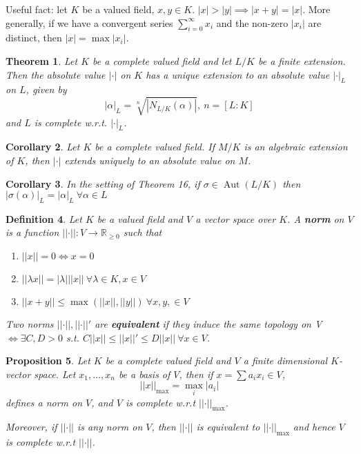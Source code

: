 \documentclass[a4paper]{article}
\newtheorem{definition}{Definition}
\newtheorem{theorem}[definition]{Theorem}
\newtheorem{prop}[definition]{Proposition}
\newtheorem{corollary}[definition]{Corollary}
\newcommand*\abs[1]{\left|#1\right|}
\newcommand*\norm[1]{\abs{\abs{#1}}}
\DeclareMathOperator{\Aut}{Aut}
\begin{document}
Useful fact: let $K$ be a valued field, $x, y \in K$. $\abs{x} > \abs{y} \implies \abs{x+y} = \abs{x}$.
More generally, if we have a convergent series $\sum_{i=0}^\infty x_i$ and the non-zero $\abs{x_i}$ are distinct,
then $\abs{x} = \max \abs{x_i}$.

\begin{theorem}
	Let $K$ be a complete valued field and let $L/K$ be a finite extension.
	Then the absolute value $\abs{\cdot}$ on $K$ has a unique extension to an absolute value $\abs{\cdot}_L$ on $L$,
	given by $$\abs{\alpha}_L = \sqrt[n]{\abs{N_{L/K}(\alpha)}},\ n=[L:K]$$
	and $L$ is complete w.r.t. $\abs{\cdot}_L$. 
	\label{29}
\end{theorem}

\begin{corollary}
	Let $K$ be a complete valued field. 
	If $M/K$ is an algebraic extension of $K$,
	then $\abs{\cdot}$ extends uniquely to an absolute value on $M$.
\end{corollary}

\begin{corollary}
	In the setting of Theorem 16, if $\sigma \in \Aut(L/K)$ then $\abs{\sigma(\alpha)}_L = \abs{\alpha}_L\ \forall \alpha \in L$
\end{corollary}

\begin{definition}
	Let $K$ be a valued field and $V$ a vector space over $K$. A \textbf{norm} on $V$ is a function $\norm{\cdot}: V \to \mathbb{R}_{\geq 0}$ such that
	\begin{enumerate}[label=\roman*.]
		\item $\norm{x} = 0 \iff x = 0$
		\item $\norm{\lambda x} = \abs{\lambda}\norm{x}\ \forall \lambda \in K, x \in V$
		\item $\norm{x+y} \leq \max(\norm{x}, \norm{y})\ \forall x,y, \in V$
	\end{enumerate}
	Two norms $\norm{\cdot}, \norm{\cdot}'$ are \textbf{equivalent} if they induce the same topology on V
	$\iff \exists C,D > 0$ s.t. $C\norm{x} \leq \norm{x}' \leq D\norm{x}\ \forall x \in V$.
\end{definition}

\begin{prop}
	Let $K$ be a complete valued field and $V$ a finite dimensional $K$-vector space.
	Let $x_1, \dots, x_n$ be a basis of $V$, 
	then if $x = \sum a_i x_i \in V$, 
	$$\norm{x}_{\max} = \max_i \abs{a_i}$$ defines a norm on $V$, 
	and $V$ is complete w.r.t $\norm{\cdot}_{\max}$.
	
	Moreover, if $\norm{\cdot}$ is any norm on $V$, 
	then $\norm{\cdot}$ is equivalent to $\norm{\cdot}_{\max}$ and hence $V$ is complete w.r.t $\norm{\cdot}$.
	\label{33}
\end{prop}
	
\end{document}
